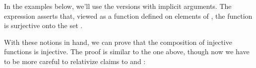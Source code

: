 \documentclass[letterpaper,10pt,english]{sphinxmanual}
\begin{document}
\begin{sphinxVerbatim}[commandchars=\\\{\}]
             

                      

                   
               
   
\end{sphinxVerbatim}

\sphinxAtStartPar
In the examples below, we’ll use the versions with implicit arguments. The expression  asserts that, viewed as a function defined on elements of , the function  is surjective onto the set .

\sphinxAtStartPar
With these notions in hand, we can prove that the composition of injective functions is injective. The proof is similar to the one above, though now we have to be more careful to relativize claims to  and :
\end{document}

